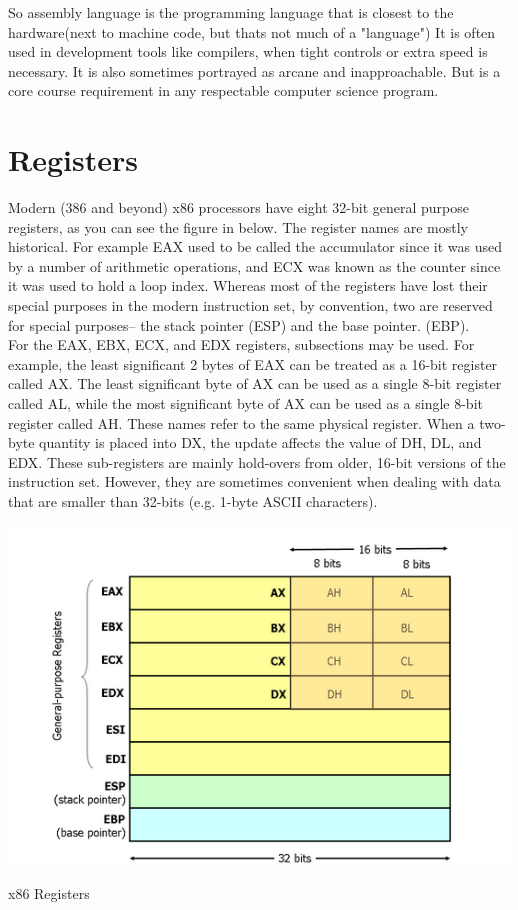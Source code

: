 \documentclass[12pt]{extarticle}
\begin{document}
So assembly language is the programming language that is closest to the hardware(next to machine code, but thats not much of a "language")
It is often used in development tools like compilers, when tight controls or extra speed is necessary. It is also sometimes
portrayed as arcane and inapproachable. But is a core course requirement in any respectable computer science program.


\section{Registers}

Modern (386 and beyond) x86 processors have eight 32-bit general purpose registers, as you can see the figure in below. The register names are mostly
historical. For example EAX used to be called the accumulator since it was used by a number of arithmetic operations, and ECX was known as the counter since it was used to hold a loop index.
Whereas most of the registers have lost their special purposes in the modern instruction set, by convention, two are reserved for special purposes--
the stack pointer (ESP) and the base pointer. (EBP). \\

For the EAX, EBX, ECX, and EDX registers, subsections may be used. For example, the least significant 2 bytes of EAX can be treated as a 16-bit register called AX. The least significant byte of AX can be used as a single 8-bit register called AL, while the most significant byte of AX can be used as a single 8-bit register called AH. These names refer to the same physical register. When a two-byte quantity is placed into DX, the update affects the value of DH, DL, and EDX. These sub-registers are mainly hold-overs from older, 16-bit versions of the instruction set. However, they are sometimes convenient when dealing with data that are smaller than 32-bits (e.g. 1-byte ASCII characters). 

\begin{center}

    \includegraphics[width=15cm, height=9cm]{x86 Registers}
    
        x86 Registers
    
 \end{center}
\end{document}
